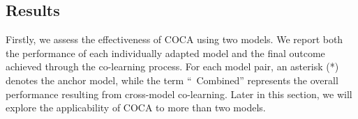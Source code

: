 

\vspace{-4pt}
\subsection{Results}
Firstly, we assess the effectiveness of COCA using two models. We report both the performance of each individually adapted model and the final outcome achieved through the co-learning process. For each model pair, an asterisk (*) denotes the anchor model, while the term ``\textbullet~Combined'' represents the overall performance resulting from cross-model co-learning. Later in this section, we will explore the applicability of COCA to more than two models. 


\begin{table}[t]
\centering
\setlength{\tabcolsep}{12pt} %
    \renewcommand{\arraystretch}{0.9} %
\vspace{-0.1in}
    \caption{Results on the OfficeHome dataset (\%). COCA¹ and COCA² denote collaborations between ResNet-18 and ViT-Base, and between ResNet-50 and ViT-Base, respectively.}
    \label{officehome}
    \vspace{-0.1in}
\end{table}

